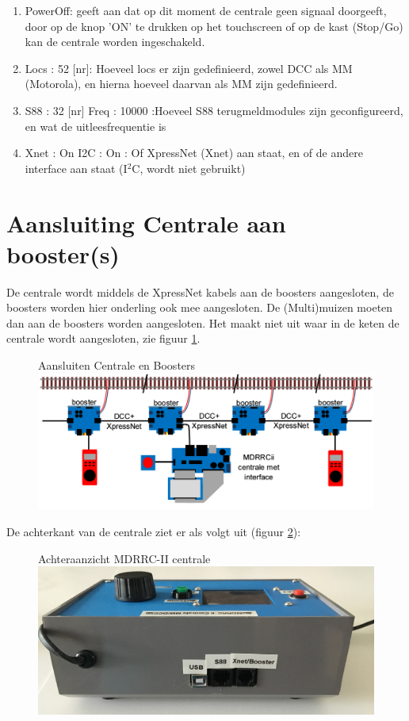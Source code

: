 \documentclass[12pt,a4paper]{report}
\newcommand*{\isqc}{I$^{2}$C}
\begin{document}
\begin{enumerate}
\item PowerOff: geeft aan dat op dit moment de centrale geen signaal doorgeeft, door op de knop 'ON' te drukken op het touchscreen of op de kast (Stop/Go) kan de centrale worden ingeschakeld.
\item Locs : 52 [nr]: Hoeveel locs er zijn gedefinieerd, zowel DCC als MM (Motorola), en hierna hoeveel daarvan als MM zijn gedefinieerd.
\item S88  : 32 [nr] Freq : 10000 :Hoeveel S88 terugmeldmodules zijn geconfigureerd, en wat de uitleesfrequentie is
\item Xnet : On  I2C : On : Of XpressNet (Xnet) aan staat, en of de andere interface aan staat (\isqc, wordt niet gebruikt)
\end{enumerate}

\section{Aansluiting Centrale aan booster(s)}
De centrale wordt middels de XpressNet kabels aan de boosters aangesloten, de boosters worden hier onderling ook mee aangesloten. De (Multi)muizen moeten dan aan de boosters worden aangesloten. Het maakt niet uit waar in de keten de centrale wordt aangesloten, zie figuur \ref{im:aansluiten_booster}.

\begin{figure}[!ht]
  \captionbox
  {Aansluiten Centrale en Boosters\label{im:aansluiten_booster}}
  {\includegraphics[scale=0.5]{images/rcu_schema1}\\}
\end{figure}

De achterkant van de centrale ziet er als volgt uit (figuur \ref{centrale_achter}):\\

\begin{figure}[!ht]
  \captionbox
  {Achteraanzicht MDRRC-II centrale\label{centrale_achter}}
  {\includegraphics[scale=0.3]{images/rcu_foto5}\\}
\end{figure}
\end{document}
